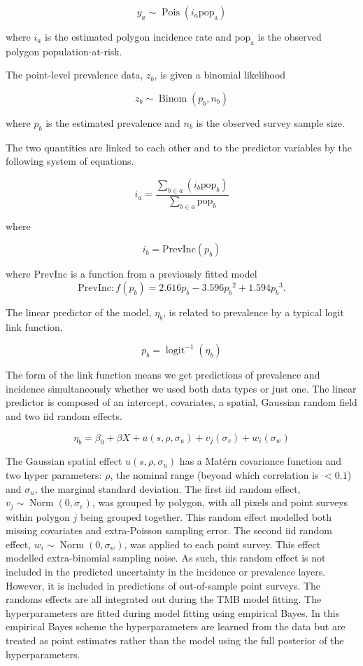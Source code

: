 \documentclass[10pt,letterpaper]{article}
\begin{document}
$$y_a \sim \operatorname{Pois}(i_a\mathrm{pop_a})$$

where $i_a$ is the estimated polygon incidence rate and $\mathrm{pop_a}$ is the observed polygon population-at-risk.

The point-level prevalence data, $z_b$, is given a binomial likelihood

$$z_b \sim \operatorname{Binom}(p_b, n_b) $$

where $p_b$ is the estimated prevalence and $n_b$ is the observed survey sample size. 

The two quantities are linked to each other and to the predictor variables by the following system of equations.

$$i_a = \frac{ \sum_{b \in a}(i_b \mathrm{pop}_b)}{\sum_{b \in a}\mathrm{pop}_b} $$

where

$$i_b = \mathrm{PrevInc}(p_b)$$

where $\mathrm{PrevInc}$ is a function from a previously fitted model \cite{cameron2015defining} 
$$\mathrm{PrevInc}: f\left(p_b\right) = 2.616p_b - 3.596{p_b}^2 + 1.594{p_b}^3.$$

The linear predictor of the model, $\eta_b$, is related to prevalence by a typical logit link function.

$$p_b = \operatorname{logit}^{-1}(\eta_b)$$


The form of the link function means we get predictions of prevalence and incidence simultaneously whether we used both data types or just one.
The linear predictor is composed of an intercept, covariates, a spatial, Gaussian random field and two iid random effects.

$$\eta_b = \beta_0 + \beta X  + u(s, \rho, \sigma_u) + v_j(\sigma_v) + w_i(\sigma_w)$$

The Gaussian spatial effect $u(s, \rho, \sigma_u)$ has a Mat\'ern covariance function and two hyper parameters: $\rho$, the nominal range (beyond which correlation is $< 0.1$) and $\sigma_u$, the marginal standard deviation.
The first iid random effect, $v_j \sim \operatorname{Norm}(0, \sigma_v)$,  was grouped by polygon, with all pixels and point surveys within polygon $j$ being grouped together.
This random effect modelled both missing covariates and extra-Poisson sampling error. 
The second iid random effect, $w_i \sim \operatorname{Norm}(0, \sigma_w)$, was applied to each point survey.
This effect modelled extra-binomial sampling noise.
As such, this random effect is not included in the predicted uncertainty in the incidence or prevalence layers.
However, it is included in predictions of out-of-sample point surveys.
The randoms effects are all integrated out during the TMB model fitting.
The hyperparameters are fitted during model fitting using empirical Bayes.
In this empirical Bayes scheme the hyperparameters are learned from the data but are treated as point estimates rather than the model using the full posterior of the hyperparameters.
\end{document}
